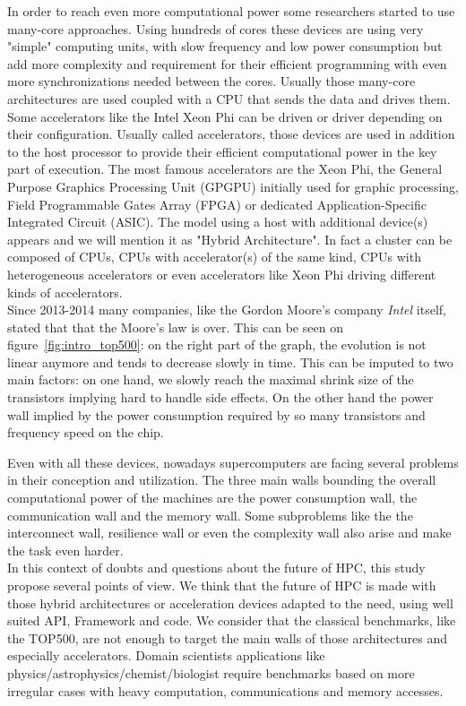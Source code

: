 In order to reach even more computational power some researchers started to use many-core approaches. 
Using hundreds of cores these devices are using very "simple" computing units, with slow frequency and low power consumption but add more complexity and requirement for their efficient programming with even more synchronizations needed between the cores. 
Usually those many-core architectures are used coupled with a CPU that sends the data and drives them.
Some accelerators like the Intel Xeon Phi can be driven or driver depending on their configuration. 
Usually called accelerators, those devices are used in addition to the host processor to provide their efficient computational power in the key part of execution. 
The most famous accelerators are the Xeon Phi, the General Purpose Graphics Processing Unit (GPGPU) initially used for graphic processing, Field Programmable Gates Array (FPGA) or dedicated Application-Specific Integrated Circuit (ASIC).
The model using a host with additional device(s) appears and we will mention it as "Hybrid Architecture".
In fact a cluster can be composed of CPUs, CPUs with accelerator(s) of the same kind, CPUs with heterogeneous accelerators or even accelerators like Xeon Phi driving different kinds of accelerators.\\

Since 2013-2014 many companies, like the Gordon Moore's company \textit{Intel} itself, stated that that the Moore's law is over. 
This can be seen on figure~\ref{fig:intro_top500}: on the right part of the graph, the evolution is not linear anymore and tends to decrease slowly in time. 
This can be imputed to two main factors: on one hand, we slowly reach the maximal shrink size of the transistors implying hard to handle side effects. 
On the other hand the power wall implied by the power consumption required by so many transistors and frequency speed on the chip.

Even with all these devices, nowadays supercomputers are facing several problems in their conception and utilization. 
The three main walls bounding the overall computational power of the machines are the power consumption wall, the communication wall and the memory wall.  
Some subproblems like the the interconnect wall, resilience wall or even the complexity wall also arise and make the task even harder.\\

In this context of doubts and questions about the future of HPC, this study propose several points of view. 
We think that the future of HPC is made with those hybrid architectures or acceleration devices adapted to the need, using well suited API, Framework and code.
We consider that the classical benchmarks, like the TOP500, are not enough to target the main walls of those architectures and especially accelerators. 
Domain scientists applications like physics/astrophysics/chemist/biologist require benchmarks based on more irregular cases with heavy computation, communications and memory accesses. 

